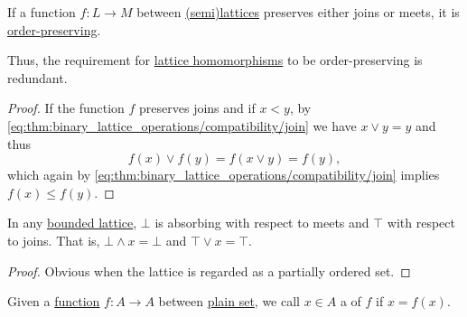 \begin{corollary}\label{thm:lattice_homomorphism_is_monotone}
  If a function \( f: L \to M \) between \hyperref[def:semilattice]{(semi)lattices} preserves either joins or meets, it is \hyperref[def:order_homomorphism/increasing]{order-preserving}.

  Thus, the requirement for \hyperref[def:semilattice/homomorphism]{lattice homomorphisms} to be order-preserving is redundant.
\end{corollary}
\begin{proof}
  If the function \( f \) preserves joins and if \( x < y \), by \eqref{eq:thm:binary_lattice_operations/compatibility/join} we have \( x \vee y = y \) and thus
  \begin{equation*}
    f(x) \vee f(y) = f(x \vee y) = f(y),
  \end{equation*}
  which again by \eqref{eq:thm:binary_lattice_operations/compatibility/join} implies \( f(x) \leq f(y) \).
\end{proof}

\begin{proposition}\label{thm:bounded_lattice_absorbing}
  In any \hyperref[def:semilattice/bounded]{bounded lattice}, \( \bot \) is absorbing with respect to meets and \( \top \) with respect to joins. That is, \( \bot \wedge x = \bot \) and \( \top \vee x = \top \).
\end{proposition}
\begin{proof}
  Obvious when the lattice is regarded as a partially ordered set.
\end{proof}

\begin{definition}\label{def:fixed_point}\mimprovised
  Given a \hyperref[def:function]{function} \( f: A \to A \) between \hyperref[def:set]{plain set}, we call \( x \in A \) a  of \( f \) if \( x = f(x) \).
\end{definition}

